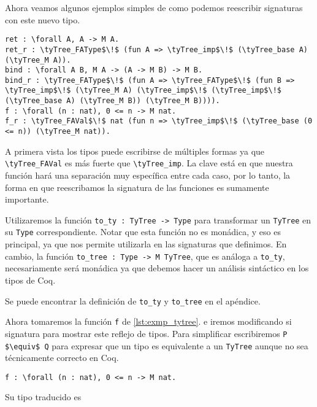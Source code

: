 Ahora veamos algunos ejemplos simples de como podemos reescribir signaturas con este nuevo tipo.

\begin{lstlisting}[frame=tb,caption={Ejemplos de \lstinline{TyTree}},label=lst:exmp_tytree]
ret : \forall A, A -> M A.
ret_r : \tyTree_FAType$\!$ (fun A => \tyTree_imp$\!$ (\tyTree_base A) (\tyTree_M A)).
bind : \forall A B, M A -> (A -> M B) -> M B.
bind_r : \tyTree_FAType$\!$ (fun A => \tyTree_FAType$\!$ (fun B => \tyTree_imp$\!$ (\tyTree_M A) (\tyTree_imp$\!$ (\tyTree_imp$\!$ (\tyTree_base A) (\tyTree_M B)) (\tyTree_M B)))).
f : \forall (n : nat), 0 <= n -> M nat.
f_r : \tyTree_FAVal$\!$ nat (fun n => \tyTree_imp$\!$ (\tyTree_base (0 <= n)) (\tyTree_M nat)).
\end{lstlisting}

A primera vista los tipos puede escribirse de múltiples formas ya que \lstinline{\tyTree_FAVal} es más fuerte que \lstinline{\tyTree_imp}. La clave está en que nuestra función \lift hará una separación muy específica entre cada caso, por lo tanto, la forma en que reescribamos la signatura de las funciones es sumamente importante.

Utilizaremos la función \lstinline{to_ty : TyTree -> Type} para transformar un \lstinline{TyTree} en su \lstinline{Type} correspondiente. Notar que esta función no es monádica, y eso es principal, ya que nos permite utilizarla en las signaturas que definimos. En cambio, la función \lstinline{to_tree : Type -> M TyTree}, que es análoga a \lstinline{to_ty}, necesariamente será monádica ya que debemos hacer un análisis sintáctico en los tipos de Coq.

Se puede encontrar la definición de \lstinline{to_ty} y \lstinline{to_tree} en el apéndice.

\iffalse
Ahora tomaremos la función \lstinline{f} de \ref{lst:exmp_tytree}. e iremos modificando si signatura para mostrar este reflejo de tipos.
Para simplificar escribiremos \lstinline{P $\equiv$ Q} para expresar que un tipo es equivalente a un \lstinline{TyTree} aunque no sea técnicamente correcto en Coq.

\begin{lstlisting}
f : \forall (n : nat), 0 <= n -> M nat.
\end{lstlisting}

Su tipo traducido es

